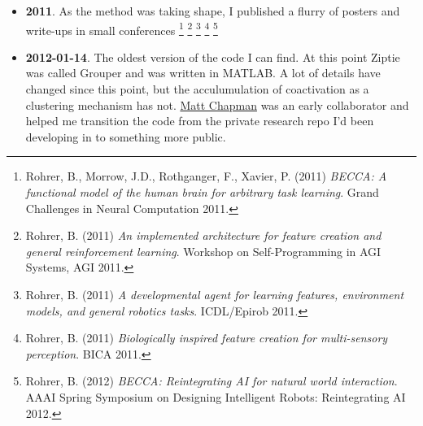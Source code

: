 \begin{itemize}

\item{\textbf{2011}. As the method was taking shape, I published a 
flurry of posters and write-ups in small conferences
\footnote{
Rohrer, B., Morrow, J.D., Rothganger, F., Xavier, P. (2011)
\textit{BECCA: A functional model of the human brain
for arbitrary task learning}.
Grand Challenges in Neural Computation 2011.
}
\footnote{
Rohrer, B. (2011) \textit{An implemented architecture for
feature creation and general reinforcement learning}.
Workshop on Self-Programming in AGI Systems, AGI 2011.
}
\footnote{
Rohrer, B. (2011) \textit{A developmental agent for learning features,
environment models, and general robotics tasks}. ICDL/Epirob 2011.
}
\footnote{
Rohrer, B. (2011) \textit{Biologically inspired feature creation
for multi-sensory perception}. BICA 2011.
}
\footnote{
Rohrer, B. (2012) \textit{BECCA: Reintegrating AI for
natural world interaction}. AAAI Spring Symposium on Designing
Intelligent Robots: Reintegrating AI 2012.
}
}

\item{\textbf{2012-01-14}.
The oldest version of the code I can find.
At this point Ziptie was called Grouper
and was written in MATLAB. A lot of details have changed since this point,
but the acculumulation of coactivation as a clustering mechanism has not.
\href{https://www.linkedin.com/in/mattchapmansoftwareengineer/}{Matt Chapman}
was an early collaborator and helped me transition the code from the private
research repo I'd been developing in to something more public.
}


\end{itemize}
